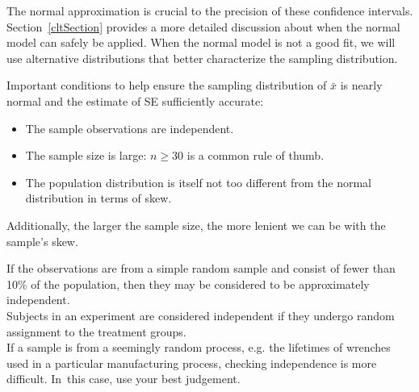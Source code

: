 The normal approximation is crucial to the precision of these confidence intervals. Section~\ref{cltSection} provides a more detailed discussion about when the normal model can safely be applied. When the normal model is not a good fit, we will use alternative distributions that better characterize the sampling distribution.

\begin{termBox}{
Important conditions to help ensure the sampling distribution of $\bar{x}$ is nearly normal and the estimate of SE sufficiently accurate:
\begin{itemize}
\setlength{\itemsep}{0mm}
\item The sample observations are independent.
\item The sample size is large: $n\geq30$ is a common rule of thumb.
\item The population distribution is itself not too different from the normal distribution in terms of skew.
\end{itemize}
Additionally, the larger the sample size, the more lenient we can be with the sample's skew.}
\end{termBox}

\begin{tipBox}{
If the observations are from a simple random sample and consist of fewer than 10\% of the population, then they may be considered to be approximately independent.\\[2mm]
Subjects in an experiment are considered independent if they undergo random assignment to the treatment groups. \\[2mm]
If a sample is from a seemingly random process, e.g. the lifetimes of wrenches used in a particular manufacturing process, checking independence is more difficult. In~this case, use your best judgement.}
\end{tipBox}


